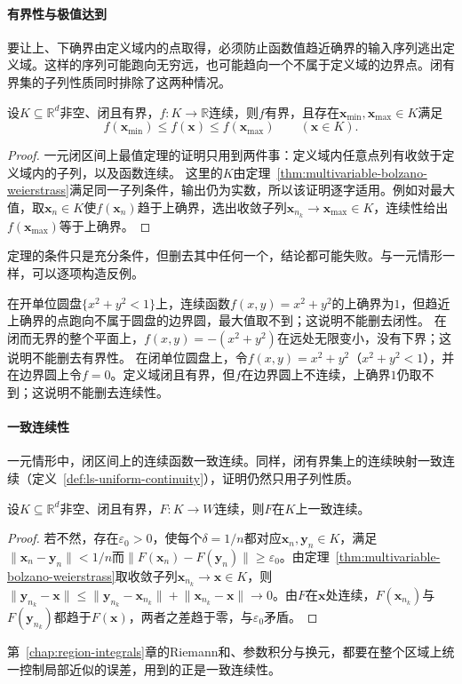 \paragraph{有界性与极值达到}
要让上、下确界由定义域内的点取得，必须防止函数值趋近确界的输入序列逃出定义域。这样的序列可能跑向无穷远，也可能趋向一个不属于定义域的边界点。闭有界集的子列性质同时排除了这两种情况。
\begin{theorem}[闭有界集上的极值定理]
\label{thm:multivariable-extreme-value}
\label{thm:ls-extreme-value}
设$K\subseteq\mathbb R^d$非空、闭且有界，$f:K\to\mathbb R$连续，则$f$有界，且存在$\bm x_{\min},\bm x_{\max}\in K$满足
\[
 f(\bm x_{\min})\leq f(\bm x)\leq f(\bm x_{\max})\qquad(\bm x\in K).
\]
\end{theorem}
\begin{proof}
一元闭区间上最值定理的证明只用到两件事：定义域内任意点列有收敛于定义域内的子列，以及函数连续。
这里的$K$由定理~\ref{thm:multivariable-bolzano-weierstrass}满足同一子列条件，输出仍为实数，所以该证明逐字适用。例如对最大值，取$\bm x_n\in K$使$f(\bm x_n)$趋于上确界，选出收敛子列$\bm x_{n_k}\to\bm x_{\max}\in K$，连续性给出$f(\bm x_{\max})$等于上确界。
\end{proof}
定理的条件只是充分条件，但删去其中任何一个，结论都可能失败。与一元情形一样，可以逐项构造反例。
\begin{example}
\label{ex:multivariable-extreme-value-failures}
在开单位圆盘$\{x^2+y^2<1\}$上，连续函数$f(x,y)=x^2+y^2$的上确界为$1$，但趋近上确界的点跑向不属于圆盘的边界圆，最大值取不到；这说明不能删去闭性。
在闭而无界的整个平面上，$f(x,y)=-(x^2+y^2)$在远处无限变小，没有下界；这说明不能删去有界性。
在闭单位圆盘上，令$f(x,y)=x^2+y^2$（$x^2+y^2<1$），并在边界圆上令$f=0$。定义域闭且有界，但$f$在边界圆上不连续，上确界$1$仍取不到；这说明不能删去连续性。
\end{example}

\paragraph{一致连续性}
一元情形中，闭区间上的连续函数一致连续。同样，闭有界集上的连续映射一致连续（定义~\ref{def:ls-uniform-continuity}），证明仍然只用子列性质。
\begin{theorem}[闭有界集上的一致连续性]
\label{thm:multivariable-uniform-continuity}
设$K\subseteq\mathbb R^d$非空、闭且有界，$F:K\to W$连续，则$F$在$K$上一致连续。
\end{theorem}
\begin{proof}
若不然，存在$\varepsilon_0>0$，使每个$\delta=1/n$都对应$\bm x_n,\bm y_n\in K$，满足$\lVert\bm x_n-\bm y_n\rVert<1/n$而$\lVert F(\bm x_n)-F(\bm y_n)\rVert\geq\varepsilon_0$。由定理~\ref{thm:multivariable-bolzano-weierstrass}取收敛子列$\bm x_{n_k}\to\bm x\in K$，则$\lVert\bm y_{n_k}-\bm x\rVert\leq\lVert\bm y_{n_k}-\bm x_{n_k}\rVert+\lVert\bm x_{n_k}-\bm x\rVert\to0$。由$F$在$\bm x$处连续，$F(\bm x_{n_k})$与$F(\bm y_{n_k})$都趋于$F(\bm x)$，两者之差趋于零，与$\varepsilon_0$矛盾。
\end{proof}
第~\ref{chap:region-integrals}章的Riemann和、参数积分与换元，都要在整个区域上统一控制局部近似的误差，用到的正是一致连续性。

